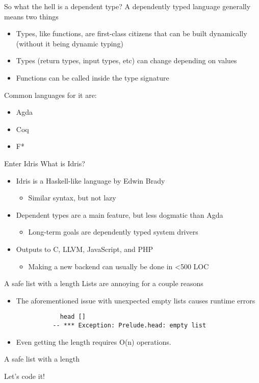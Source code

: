 \documentclass{beamer}
\begin{document}
\begin{frame}{So what the hell is a dependent type? }
 	\transdissolve
	A dependently typed language generally means two things
	\begin{itemize}	
		\pause
		\item Types, like functions, are first-class citizens that can be built dynamically (without it being dynamic typing)
		\pause
		\item Types (return types, input types, etc) can change depending on values
		\pause
                \item Functions can be called inside the type signature
	\end{itemize}
	\pause
	Common languages for it are: 
	\begin{itemize}	
		\item Agda
		\item Coq 
		\item F*
	\end{itemize}
\end{frame}
\begin{frame}{Enter Idris}
	\transdissolve
	What is Idris? 
	\begin{itemize}
		\pause
		\item Idris is a Haskell-like language by Edwin Brady \begin{itemize}
				\item Similar syntax, but not lazy
	\end{itemize}
	\pause
\item Dependent types are a main feature, but less dogmatic than Agda \begin{itemize}
		\item Long-term goals are dependently typed system drivers
	\end{itemize}
		\pause
		\item Outputs to C, LLVM, JavaScript, and PHP \begin{itemize}
				\item Making a new backend can usually be done in \textless 500 LOC
			\end{itemize}
	\end{itemize}
\end{frame}
\begin{frame}[fragile]{A safe list with a length}
	\transdissolve
	Lists are annoying for a couple reasons
	\begin{itemize}
		\pause
		\item The aforementioned issue with unexpected empty lists causes runtime errors
		\pause
		\begin{lstlisting} 
			head [] 
		  -- *** Exception: Prelude.head: empty list
		\end{lstlisting}
	\pause
	\item Even getting the length requires O(n) operations.
	\end{itemize}
	
\end{frame}
\begin{frame}{A safe list with a length}
	\transdissolve
	\begin{center} 
		Let's code it!
	\end{center}
\end{frame}
\end{document}

